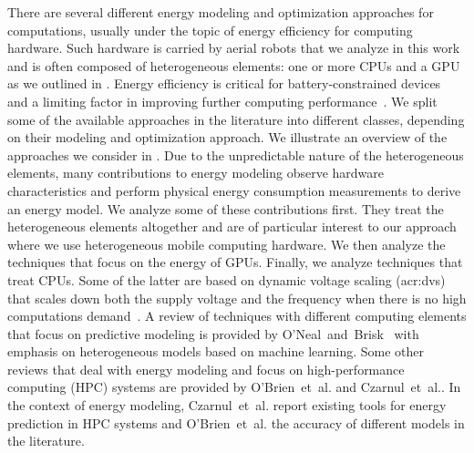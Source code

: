 There are several different energy modeling and optimization approaches for computations, usually under the topic of energy efficiency for computing hardware.
Such hardware is carried by aerial robots that we analyze in this work and is often composed of heterogeneous elements: one or more CPUs and a GPU as we outlined in . Energy efficiency is critical for battery-constrained devices~\citep{rao2005battery} and a limiting factor in improving further computing performance~\citep{horowitz2014computing}. We split some of the available approaches in the literature into different classes, depending on their modeling and optimization approach. We illustrate an overview of the approaches we consider in . Due to the unpredictable nature of the heterogeneous elements, many contributions to energy modeling observe hardware characteristics and perform physical energy consumption measurements to derive an energy model. We analyze some of these contributions first. They treat the heterogeneous elements altogether and are of particular interest to our approach where we use heterogeneous mobile computing hardware. We then analyze the techniques that focus on the energy of GPUs. Finally, we analyze techniques that treat CPUs. Some of the latter are based on dynamic voltage scaling (\Gls{acr:dvs}) that scales down both the supply voltage and the frequency when there is no high computations demand~\citep{flautner2001automatic, chen2009fundamentals}. A review of techniques with different computing elements that focus on predictive modeling is provided by O'Neal~and~Brisk~\citep{oneal2018predictive} with emphasis on heterogeneous models based on machine learning.
Some other reviews that deal with energy modeling and focus on high-performance computing (HPC) systems are provided by O'Brien~et~al.\citep{obrien2017survey} and Czarnul~et~al.\citep{czarnul2019energy}. In the context of energy modeling, Czarnul~et~al. report existing tools for energy prediction in HPC systems and O'Brien~et~al. the accuracy of different models in the literature.

